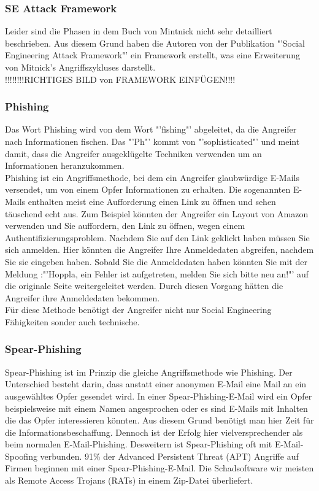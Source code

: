 		\subsubsection{SE Attack Framework}
		Leider sind die Phasen in dem Buch von Mintnick \cite{ArtOfDeception} nicht sehr detailliert beschrieben. Aus diesem Grund haben die Autoren von der Publikation "'Social Engineering Attack Framework"' \cite{AttackFramework} ein Framework erstellt, was eine Erweiterung von Mitnick's Angriffszykluses darstellt.\\
		
		!!!!!!!!RICHTIGES BILD von FRAMEWORK EINFÜGEN!!!!\\
		
		\subsubsection{Phishing}
		Das Wort Phishing wird von dem Wort "'fishing"' abgeleitet, da die Angreifer nach Informationen fischen. Das "'Ph"' kommt von "'sophisticated"' und meint damit, dass die Angreifer ausgeklügelte Techniken verwenden um an Informationen heranzukommen.\cite{PhishingExposed}\\
		Phishing ist ein Angriffsmethode, bei dem ein Angreifer glaubwürdige E-Mails versendet, um von einem Opfer Informationen zu erhalten. Die sogenannten E-Mails enthalten meist eine Aufforderung einen Link zu öffnen und sehen täuschend echt aus. Zum Beispiel könnten der Angreifer ein Layout von Amazon verwenden und Sie auffordern, den Link zu öffnen, wegen einem Authentifizierungsproblem. Nachdem Sie auf den Link geklickt haben müssen Sie sich anmelden. Hier könnten die Angreifer Ihre Anmeldedaten abgreifen, nachdem Sie sie eingeben haben. Sobald Sie die Anmeldedaten haben könnten Sie mit der Meldung :"'Hoppla, ein Fehler ist aufgetreten, melden Sie sich bitte neu an!"' auf die originale Seite weitergeleitet werden. Durch diesen Vorgang hätten die Angreifer ihre Anmeldedaten bekommen.\\
		Für diese Methode benötigt der Angreifer nicht nur Social Engineering Fähigkeiten sonder auch technische.\cite{PhishingDarkWaters}
		
		\subsubsection{Spear-Phishing}
		Spear-Phishing ist im Prinzip die gleiche Angriffsmethode wie Phishing. Der Unterschied besteht darin, dass anstatt einer anonymen E-Mail eine Mail an ein ausgewähltes Opfer gesendet wird. In einer Spear-Phishing-E-Mail wird ein Opfer beispielsweise mit einem Namen angesprochen oder es sind E-Mails mit Inhalten die das Opfer interessieren könnten. Aus diesem Grund benötigt man hier Zeit für die Informationsbeschaffung. Dennoch ist der Erfolg hier  vielversprechender als beim normalen E-Mail-Phishing. Desweitern ist Spear-Phishing oft mit E-Mail-Spoofing verbunden.
		91\% der Advanced Persistent Threat (APT) Angriffe auf Firmen beginnen mit einer Spear-Phishing-E-Mail. Die Schadsoftware wir meisten als Remote Access Trojans (RATs) in einem Zip-Datei überliefert.\cite{SpearPhishing}


